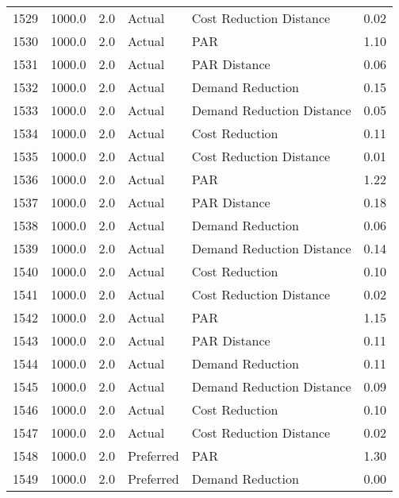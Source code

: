 \begin{longtable}{lrrllr}
1529 &       1000.0 &     2.0 &         Actual &    Cost Reduction Distance &   0.02 \\
1530 &       1000.0 &     2.0 &         Actual &                        PAR &   1.10 \\
1531 &       1000.0 &     2.0 &         Actual &               PAR Distance &   0.06 \\
1532 &       1000.0 &     2.0 &         Actual &           Demand Reduction &   0.15 \\
1533 &       1000.0 &     2.0 &         Actual &  Demand Reduction Distance &   0.05 \\
1534 &       1000.0 &     2.0 &         Actual &             Cost Reduction &   0.11 \\
1535 &       1000.0 &     2.0 &         Actual &    Cost Reduction Distance &   0.01 \\
1536 &       1000.0 &     2.0 &         Actual &                        PAR &   1.22 \\
1537 &       1000.0 &     2.0 &         Actual &               PAR Distance &   0.18 \\
1538 &       1000.0 &     2.0 &         Actual &           Demand Reduction &   0.06 \\
1539 &       1000.0 &     2.0 &         Actual &  Demand Reduction Distance &   0.14 \\
1540 &       1000.0 &     2.0 &         Actual &             Cost Reduction &   0.10 \\
1541 &       1000.0 &     2.0 &         Actual &    Cost Reduction Distance &   0.02 \\
1542 &       1000.0 &     2.0 &         Actual &                        PAR &   1.15 \\
1543 &       1000.0 &     2.0 &         Actual &               PAR Distance &   0.11 \\
1544 &       1000.0 &     2.0 &         Actual &           Demand Reduction &   0.11 \\
1545 &       1000.0 &     2.0 &         Actual &  Demand Reduction Distance &   0.09 \\
1546 &       1000.0 &     2.0 &         Actual &             Cost Reduction &   0.10 \\
1547 &       1000.0 &     2.0 &         Actual &    Cost Reduction Distance &   0.02 \\
1548 &       1000.0 &     2.0 &      Preferred &                        PAR &   1.30 \\
1549 &       1000.0 &     2.0 &      Preferred &           Demand Reduction &   0.00 \\

\end{longtable}
